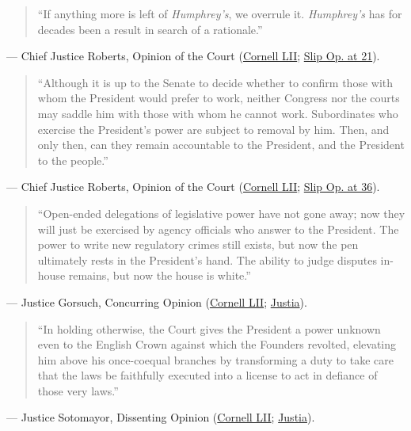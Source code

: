 \documentclass[12pt]{article}
\begin{document}
\begin{quote}
``If anything more is left of \textit{Humphrey's}, we overrule it. \textit{Humphrey's} has for decades been a result in search of a rationale.''
\end{quote}
\noindent --- Chief Justice Roberts, Opinion of the Court (\href{https://www.law.cornell.edu/supremecourt/text/25-332}{Cornell LII}; \href{https://www.supremecourt.gov/opinions/25pdf/25-322_new_4gcj.pdf}{Slip Op. at 21}).

\begin{quote}
``Although it is up to the Senate to decide whether to confirm those with whom the President would prefer to work, neither Congress nor the courts may saddle him with those with whom he cannot work. Subordinates who exercise the President's power are subject to removal by him. Then, and only then, can they remain accountable to the President, and the President to the people.''
\end{quote}
\noindent --- Chief Justice Roberts, Opinion of the Court (\href{https://www.law.cornell.edu/supremecourt/text/25-332}{Cornell LII}; \href{https://www.supremecourt.gov/opinions/25pdf/25-322_new_4gcj.pdf}{Slip Op. at 36}).

\begin{quote}
``Open-ended delegations of legislative power have not gone away; now they will just be exercised by agency officials who answer to the President. The power to write new regulatory crimes still exists, but now the pen ultimately rests in the President's hand. The ability to judge disputes in-house remains, but now the house is white.''
\end{quote}
\noindent --- Justice Gorsuch, Concurring Opinion (\href{https://www.law.cornell.edu/supremecourt/text/25-332}{Cornell LII}; \href{https://supreme.justia.com/cases/federal/us/609/25-332/}{Justia}).

\begin{quote}
``In holding otherwise, the Court gives the President a power unknown even to the English Crown against which the Founders revolted, elevating him above his once-coequal branches by transforming a duty to take care that the laws be faithfully executed into a license to act in defiance of those very laws.''
\end{quote}
\noindent --- Justice Sotomayor, Dissenting Opinion (\href{https://www.law.cornell.edu/supremecourt/text/25-332}{Cornell LII}; \href{https://supreme.justia.com/cases/federal/us/609/25-332/}{Justia}).
\end{document}
